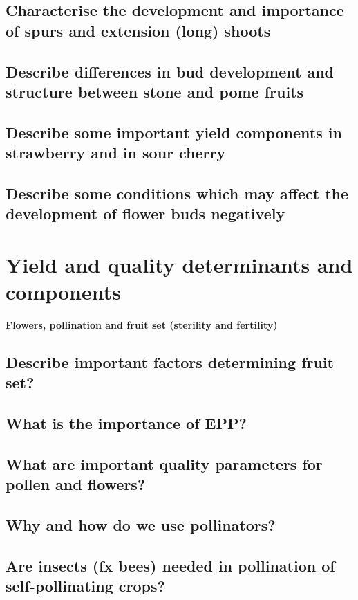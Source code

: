 \subsection{Characterise the development and importance of spurs and extension 
(long) shoots}
\subsection{Describe differences in bud development and structure between stone 
and pome fruits}
\subsection{Describe some important yield components in strawberry and in sour 
cherry}
\subsection{Describe some conditions which may affect the development of 
flower buds negatively}


\vspace{1em}
\section{Yield and quality determinants and components}
\textbf{Flowers, pollination and fruit set (sterility and fertility)}

\subsection{Describe important factors determining fruit set? }
\subsection{What is the importance of EPP?}
\subsection{What are important quality parameters for pollen and flowers?}
\subsection{Why and how do we use pollinators?}
\subsection{Are insects (fx bees) needed in pollination of self-pollinating crops?}


\vspace{1em}
